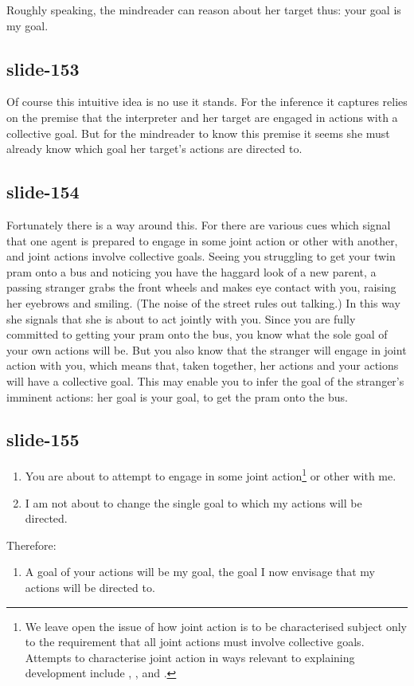 \documentclass[12pt,\papersize]{extarticle}
\begin{document}
Roughly speaking, the mindreader can reason about her target thus: your goal is my goal.

\subsection{slide-153}
Of course this intuitive idea is no use it stands.
For the inference it captures relies on the premise that the interpreter and her
target are engaged in actions with a collective goal.
But for the mindreader to know this premise it seems she must
already know which goal her target's actions are directed to.

\subsection{slide-154}
Fortunately there is a way around this.
For there are various cues which signal that one agent is prepared
to engage in some joint action or other with another,
and joint actions involve collective goals.
\label{twin_pram}
Seeing you struggling to get your twin pram onto a bus and noticing you have
the haggard look of a new parent, a passing stranger  grabs the front wheels
and makes eye contact with you, raising her eyebrows and smiling.
(The noise of the street rules out talking.)
In this way she signals that she is about to act jointly with you.
Since you are fully committed to getting your pram onto the bus,
you know what the sole goal of your own actions will be.
But you also know that the stranger will engage in joint action with you,
which means that, taken together, her actions and your actions will have a collective goal.
This may enable you to infer the goal of the stranger's imminent actions:
her goal is your goal, to get the pram onto the bus.

\subsection{slide-155}
\begin{enumerate}
\label{your_goal_is_my_goal}
\item You are
about to attempt to
engage in some joint action\footnote{
We leave open the issue of how joint action is to be characterised subject only to the
requirement that all joint actions must involve collective goals.
Attempts to characterise joint action in ways relevant to explaining development include
	\citet{Tollefsen:2005vh},
	\citet{Carpenter:2009wq},
	\citet{pacherie_framing_2011} and
	\citet{Butterfill:2011fk}.
}
or other with me.

\item I am not about to change the single goal to which my actions will be directed.

\end{enumerate}
%
Therefore:
%
\begin{enumerate}[resume]
%
\item A goal of your actions will be my goal, the goal I now envisage that my actions will be directed to.
\end{enumerate}
\end{document}
